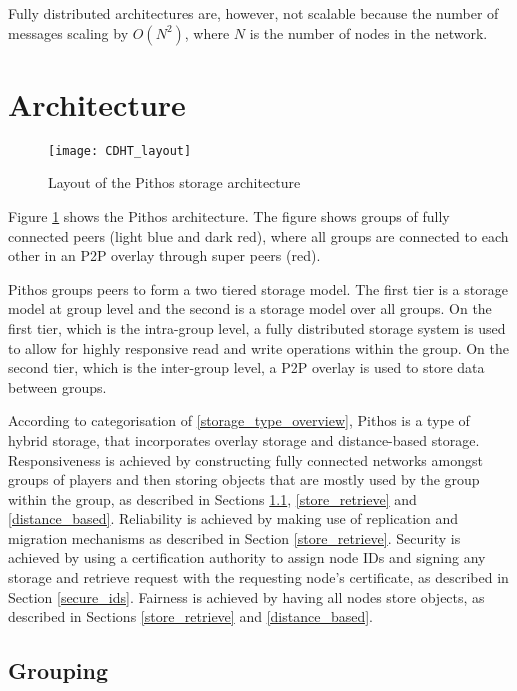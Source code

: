 Fully distributed architectures are, however, not scalable because the number of messages scaling by $O(N^2)$, where $N$ is the number of nodes in the network.

\section{Architecture}

\begin{figure}[htbp]
 \centering
 \texttt{[image: CDHT\_layout]}
 \caption{Layout of the Pithos storage architecture}
 \label{fig_pithos}
\end{figure}
%
Figure \ref{fig_pithos} shows the Pithos architecture. The figure shows groups of fully connected peers (light blue and dark red), where all groups
are connected to each other in an P2P overlay through super peers (red).

Pithos groups peers to form a two tiered storage model. The first tier is a storage model at group level and the second is a storage model over all
groups. On the first tier, which is the intra-group level, a fully distributed storage system is used to allow for highly responsive read and write operations within the group. On the second tier, which is the inter-group level, a P2P overlay is used to store data between groups.

According to categorisation of \ref{storage_type_overview}, Pithos is a type of hybrid storage, that incorporates overlay storage and distance-based
storage. Responsiveness is achieved by constructing fully connected networks amongst groups of players and then storing objects that are mostly used
by the group within the group, as described in Sections \ref{grouping}, \ref{store_retrieve} and \ref{distance_based}. Reliability is achieved by
making use of replication and migration mechanisms as described in Section \ref{store_retrieve}. Security is achieved by using a certification
authority to assign node IDs and signing any storage and retrieve request with the requesting node's certificate, as described in Section
\ref{secure_ids}. Fairness is achieved by having all nodes store objects, as described in Sections \ref{store_retrieve} and \ref{distance_based}.

\subsection{Grouping}
\label{grouping}

